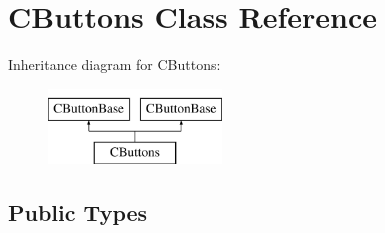 \hypertarget{class_c_buttons}{\section{C\-Buttons Class Reference}
\label{class_c_buttons}
}
Inheritance diagram for C\-Buttons\-:\begin{figure}[H]
\begin{center}
\leavevmode
\includegraphics[height=2.000000cm]{class_c_buttons}
\end{center}
\end{figure}
\subsection*{Public Types}
